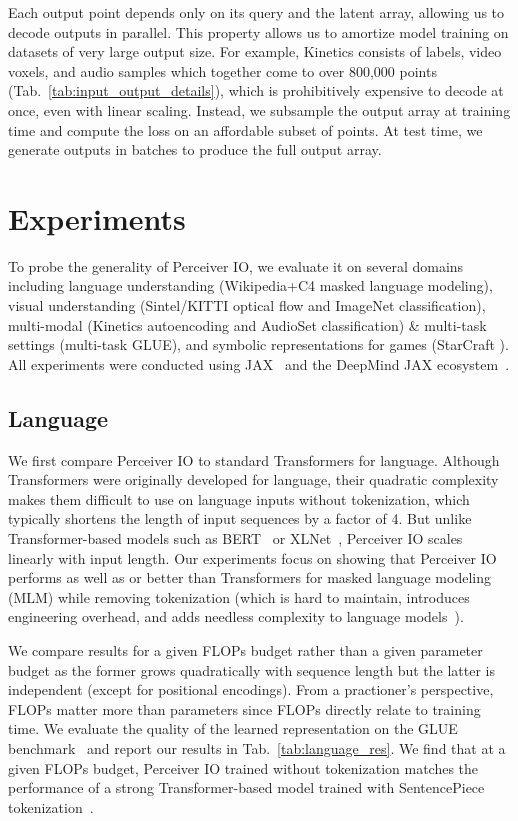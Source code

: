 \documentclass{article} \usepackage{iclr2022_conference,times}
\newcommand{\ourmodel}{Perceiver IO\xspace}
\begin{document}
Each output point depends only on its query and the latent array, allowing us to decode outputs in parallel. This property allows us to amortize model training on datasets of very large output size. For example, Kinetics consists of labels, video voxels, and audio samples which together come to over 800,000 points (Tab.~\ref{tab:input_output_details}), which is prohibitively expensive to decode at once, even with linear scaling. Instead, we subsample the output array at training time and compute the loss on an affordable subset of points. At test time, we generate outputs in batches to produce the full output array.

\vspace{-8pt}
\section{Experiments}

To probe the generality of \ourmodel{}, we evaluate it on several domains including language understanding (Wikipedia+C4 masked language modeling), visual understanding (Sintel/KITTI optical flow and ImageNet classification), multi-modal (Kinetics autoencoding and AudioSet classification) \& multi-task settings (multi-task GLUE), and symbolic representations for games (StarCraft ). All experiments were conducted using JAX~\citep{jax2018github} and the DeepMind JAX ecosystem~\citep{deepmind2020jax}.

\subsection{Language}
\label{sec:language}

We first compare \ourmodel{} to standard Transformers for language. Although Transformers were originally developed for language, their quadratic complexity makes them difficult to use on language inputs without tokenization, which typically shortens the length of input sequences by a factor of 4. But unlike Transformer-based models such as BERT~\citep{devlin2019bert} or XLNet~\citep{yang2019xlnet}, \ourmodel{} scales linearly with input length. Our experiments focus on showing that \ourmodel{} performs as well as or better than Transformers for masked language modeling (MLM) while removing tokenization (which is hard to maintain, introduces engineering overhead, and adds needless complexity to language models~\citep{bostrom2020bytes-bad, clark2021canine}).

We compare results for a given FLOPs budget rather than a given parameter budget as the former grows quadratically with sequence length but the latter is independent (except for positional encodings). From a practioner's perspective, FLOPs matter more than parameters since FLOPs directly relate to training time. We evaluate the quality of the learned representation on the GLUE benchmark~\citep{wang2018glue} and report our results in Tab.~\ref{tab:language_res}. We find that at a given FLOPs budget, \ourmodel{} trained without tokenization matches the performance of a strong Transformer-based model trained with SentencePiece tokenization~\citep{sennrich2016bpe,kudo2018sentencepiece}.
\end{document}
